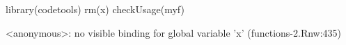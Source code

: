\begin{Schunk}
\begin{Sinput}
 library(codetools)
 rm(x)
 checkUsage(myf)
\end{Sinput}
\begin{Soutput}
<anonymous>: no visible binding for global variable 'x' (functions-2.Rnw:435)
\end{Soutput}
\end{Schunk}
